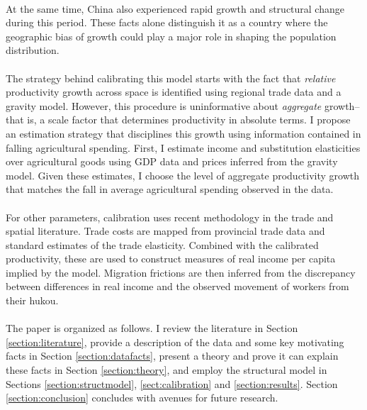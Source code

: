 \documentclass[]{article}
\theoremstyle{plain}
\begin{document}
 \paragraph*{}
 At the same time, China also experienced rapid growth and structural change during this period.  These facts alone distinguish it as a country where the geographic bias of growth could play a major role in shaping the population distribution.
\paragraph*{}
The strategy behind calibrating this model starts with the fact that \textit{relative} productivity growth across space is identified using regional trade data and a gravity model. However, this procedure is uninformative about \textit{aggregate} growth-- that is, a scale factor that determines productivity in absolute terms. I propose an estimation strategy that disciplines this growth using information contained in falling agricultural spending. First, I estimate income and substitution elasticities over agricultural goods using GDP data and prices inferred from the gravity model. Given these estimates, I choose the level of aggregate productivity growth that matches the fall in average agricultural spending observed in the data. 
\paragraph*{}
For other parameters, calibration uses recent methodology in the trade and spatial literature. Trade costs are mapped from provincial trade data and standard estimates of the trade elasticity. Combined with the calibrated productivity, these are used to construct measures of real income per capita implied by the model. Migration frictions are then inferred from the discrepancy between differences in real income and the observed movement of workers from their hukou.

\paragraph*{}
The paper is organized as follows. I review the literature in Section \ref{section:literature}, provide a description of the data and some key motivating facts in Section \ref{section:datafacts}, present a theory and prove it can explain these facts in Section \ref{section:theory}, and employ the structural model in Sections \ref{section:structmodel}, \ref{sect:calibration} and \ref{section:results}. Section \ref{section:conclusion} concludes with avenues for future research.
\end{document}
